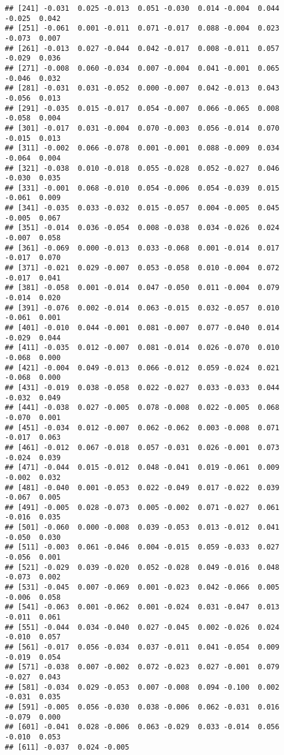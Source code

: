 \documentclass[]{article}
\begin{document}
\begin{verbatim}
## [241] -0.031  0.025 -0.013  0.051 -0.030  0.014 -0.004  0.044 -0.025  0.042
## [251] -0.061  0.001 -0.011  0.071 -0.017  0.088 -0.004  0.023 -0.073  0.007
## [261] -0.013  0.027 -0.044  0.042 -0.017  0.008 -0.011  0.057 -0.029  0.036
## [271] -0.008  0.060 -0.034  0.007 -0.004  0.041 -0.001  0.065 -0.046  0.032
## [281] -0.031  0.031 -0.052  0.000 -0.007  0.042 -0.013  0.043 -0.056  0.013
## [291] -0.035  0.015 -0.017  0.054 -0.007  0.066 -0.065  0.008 -0.058  0.004
## [301] -0.017  0.031 -0.004  0.070 -0.003  0.056 -0.014  0.070 -0.015  0.013
## [311] -0.002  0.066 -0.078  0.001 -0.001  0.088 -0.009  0.034 -0.064  0.004
## [321] -0.038  0.010 -0.018  0.055 -0.028  0.052 -0.027  0.046 -0.030  0.035
## [331] -0.001  0.068 -0.010  0.054 -0.006  0.054 -0.039  0.015 -0.061  0.009
## [341] -0.035  0.033 -0.032  0.015 -0.057  0.004 -0.005  0.045 -0.005  0.067
## [351] -0.014  0.036 -0.054  0.008 -0.038  0.034 -0.026  0.024 -0.007  0.058
## [361] -0.069  0.000 -0.013  0.033 -0.068  0.001 -0.014  0.017 -0.017  0.070
## [371] -0.021  0.029 -0.007  0.053 -0.058  0.010 -0.004  0.072 -0.017  0.041
## [381] -0.058  0.001 -0.014  0.047 -0.050  0.011 -0.004  0.079 -0.014  0.020
## [391] -0.076  0.002 -0.014  0.063 -0.015  0.032 -0.057  0.010 -0.061  0.001
## [401] -0.010  0.044 -0.001  0.081 -0.007  0.077 -0.040  0.014 -0.029  0.044
## [411] -0.035  0.012 -0.007  0.081 -0.014  0.026 -0.070  0.010 -0.068  0.000
## [421] -0.004  0.049 -0.013  0.066 -0.012  0.059 -0.024  0.021 -0.068  0.000
## [431] -0.019  0.038 -0.058  0.022 -0.027  0.033 -0.033  0.044 -0.032  0.049
## [441] -0.038  0.027 -0.005  0.078 -0.008  0.022 -0.005  0.068 -0.070  0.001
## [451] -0.034  0.012 -0.007  0.062 -0.062  0.003 -0.008  0.071 -0.017  0.063
## [461] -0.012  0.067 -0.018  0.057 -0.031  0.026 -0.001  0.073 -0.024  0.039
## [471] -0.044  0.015 -0.012  0.048 -0.041  0.019 -0.061  0.009 -0.002  0.032
## [481] -0.040  0.001 -0.053  0.022 -0.049  0.017 -0.022  0.039 -0.067  0.005
## [491] -0.005  0.028 -0.073  0.005 -0.002  0.071 -0.027  0.061 -0.016  0.035
## [501] -0.060  0.000 -0.008  0.039 -0.053  0.013 -0.012  0.041 -0.050  0.030
## [511] -0.003  0.061 -0.046  0.004 -0.015  0.059 -0.033  0.027 -0.056  0.001
## [521] -0.029  0.039 -0.020  0.052 -0.028  0.049 -0.016  0.048 -0.073  0.002
## [531] -0.045  0.007 -0.069  0.001 -0.023  0.042 -0.066  0.005 -0.006  0.058
## [541] -0.063  0.001 -0.062  0.001 -0.024  0.031 -0.047  0.013 -0.011  0.061
## [551] -0.044  0.034 -0.040  0.027 -0.045  0.002 -0.026  0.024 -0.010  0.057
## [561] -0.017  0.056 -0.034  0.037 -0.011  0.041 -0.054  0.009 -0.019  0.054
## [571] -0.038  0.007 -0.002  0.072 -0.023  0.027 -0.001  0.079 -0.027  0.043
## [581] -0.034  0.029 -0.053  0.007 -0.008  0.094 -0.100  0.002 -0.031  0.035
## [591] -0.005  0.056 -0.030  0.038 -0.006  0.062 -0.031  0.016 -0.079  0.000
## [601] -0.041  0.028 -0.006  0.063 -0.029  0.033 -0.014  0.056 -0.010  0.053
## [611] -0.037  0.024 -0.005
\end{verbatim}
\end{document}
